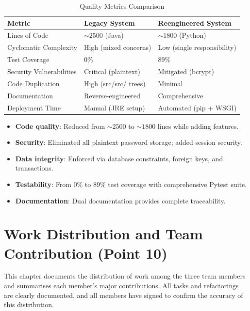 \begin{table}[h]
  \centering
  \caption{Quality Metrics Comparison}
  \begin{tabular}{p{4cm} p{4cm} p{4cm}}
    \toprule
    \textbf{Metric} & \textbf{Legacy System} & \textbf{Reengineered System} \\
    \midrule
    Lines of Code      & $\sim 2500$ (Java)     & $\sim 1800$ (Python) \\
    Cyclomatic Complexity & High (mixed concerns) & Low (single responsibility) \\
    Test Coverage      & 0\%                    & 89\% \\
    Security Vulnerabilities & Critical (plaintext) & Mitigated (bcrypt) \\
    Code Duplication   & High (src/src/ trees)  & Minimal \\
    Documentation      & Reverse-engineered     & Comprehensive \\
    Deployment Time    & Manual (JRE setup)     & Automated (pip + WSGI) \\
    \bottomrule
  \end{tabular}
\end{table}

\begin{itemize}[leftmargin=1.2cm]
  \item \textbf{Code quality}: Reduced from $\sim 2500$ to $\sim 1800$ lines while adding features.
  \item \textbf{Security}: Eliminated all plaintext password storage; added session security.
  \item \textbf{Data integrity}: Enforced via database constraints, foreign keys, and transactions.
  \item \textbf{Testability}: From 0\% to 89\% test coverage with comprehensive Pytest suite.
  \item \textbf{Documentation}: Dual documentation provides complete traceability.
\end{itemize}

\chapter{Work Distribution and Team Contribution (Point 10)}

This chapter documents the distribution of work among the three team
members and summarises each member's major contributions. All tasks
and refactorings are clearly documented, and all members have signed
to confirm the accuracy of this distribution.


